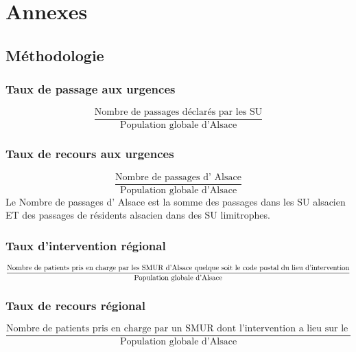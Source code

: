 \documentclass[12pt,english,french,twoside]{report}\usepackage[]{graphicx}\usepackage[]{color}
\begin{document}


\part{Annexes}
\appendix
\chapter{Méthodologie}


\section*{Taux de passage aux urgences}
  \begin{displaymath}
    \frac{\text{Nombre de passages déclarés par les SU}}{\text{Population globale d'Alsace}}
  \end{displaymath}

\section*{Taux de recours aux urgences}
\begin{displaymath}
    \frac{\text{Nombre de passages d' Alsace}}{\text{Population globale d'Alsace}}
  \end{displaymath}
Le Nombre de passages d' Alsace est la somme des passages dans les SU alsacien ET des passages de résidents alsacien dans des SU limitrophes.

\section*{Taux d'intervention régional}
\begin{displaymath}
    \frac{\text{Nombre de patients pris en charge par les SMUR d'Alsace}\linebreak[4] \text{ quelque soit le code postal du lieu d'intervention}}{\text{Population globale d'Alsace}}
  \end{displaymath}

\section*{Taux de recours régional}
\begin{displaymath}
    \frac{\text{Nombre de patients pris en charge par un SMUR dont l'intervention a lieu sur le territoire régional }}{\text{Population globale d'Alsace}}
  \end{displaymath}
\end{document}
